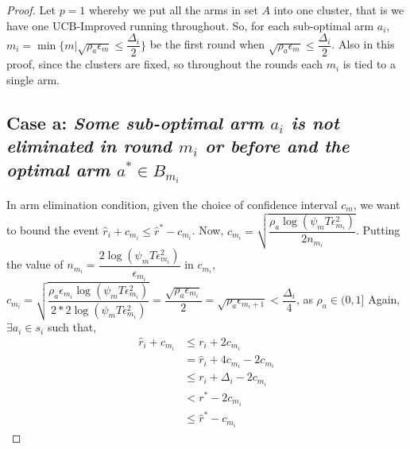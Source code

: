 \begin{proof}

Let $p=1$ whereby we put all the arms in set $A$ into one cluster, that is we have one UCB-Improved running throughout. So, for each sub-optimal arm $a_{i}$, $m_{i}=\min{\lbrace m|\sqrt{\rho_{a}\epsilon_{m}}\leq \dfrac{\Delta_{i}}{2} \rbrace}$ be the first round when $\sqrt{\rho_{a}\epsilon_{m}}\leq \dfrac{\Delta_{i}}{2}$. Also in this proof, since the clusters are fixed, so throughout the rounds each $m_{i}$ is tied to a single arm.

\subsection*{Case a: \textit{Some sub-optimal arm $a_{i}$ is not eliminated in round $m_{i}$ or before and the optimal arm $a^{*}\in B_{m_{i}}$}}

 In arm elimination condition, given the choice of confidence interval $c_{m}$, we want to bound the event $\hat{r}_{i}+c_{m_{i}}\leq \hat{r}^{*}-c_{m_{i}}$. 
  Now, $c_{m_{i}}=\sqrt{\dfrac{\rho_{a}\log (\psi_{m}T\epsilon_{m_{i}}^{2})}{2 n_{m_{i}}}}$.
  Putting the value of $n_{m_{i}}=\dfrac{2\log{(\psi_{m}T\epsilon_{m_{i}}^{2})}}{\epsilon_{m_{i}}}$ in $c_{m_{i}}$,
  $c_{m_{i}}=\sqrt{\dfrac{\rho_{a}\epsilon_{m_{i}}\log (\psi_{m}T\epsilon_{m_{i}}^{2})}{2*2 \log(\psi_{m}T\epsilon_{m_{i}}^{2})}}=\dfrac{\sqrt{\rho_{a}\epsilon_{m_{i}}}}{2} = \sqrt{\rho_{a}\epsilon_{m_{i}+1}} < \dfrac{\Delta_{i}}{4} $, as $\rho_{a}\in (0,1]$
  Again, $\exists a_{i} \in s_{i}$ such that, 
  \begin{align*}
\hat{r}_{i} + c_{m_{i}}&\leq r_{i} + 2c_{m_{i}} \\
&= \hat{r}_{i} + 4c_{m_{i}} - 2c_{m_{i}} \\
 &\leq r_{i} + \Delta_{i} - 2c_{m_{i}}\\
 &< r^{*} -2c_{m_{i}} \\
 &\leq \hat{r}^{*} - c_{m_{i}}   
  \end{align*}


\end{proof}
